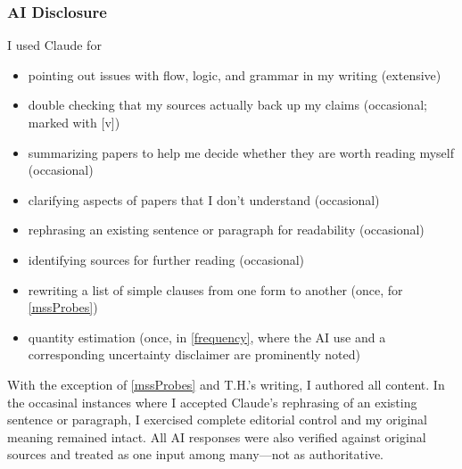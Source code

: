 \documentclass[11pt,oneside]{book}
\begin{document}
\subsubsection*{AI Disclosure}
I used Claude for
\begin{itemize}
    \item pointing out issues with flow, logic, and grammar in my writing (extensive)
    \item double checking that my sources actually back up my claims (occasional; marked with [v])
    \item summarizing papers to help me decide whether they are worth reading myself (occasional)
    \item clarifying aspects of papers that I don't understand (occasional)
    \item rephrasing an existing sentence or paragraph for readability (occasional)
    \item identifying sources for further reading (occasional)
    \item rewriting a list of simple clauses from one form to another (once, for \cref{mssProbes})
    \item quantity estimation (once, in \cref{frequency}, where the AI use and a corresponding uncertainty disclaimer are prominently noted)
\end{itemize}
With the exception of \cref{mssProbes} and T.H.'s writing, I authored all content. In the occasinal instances where I accepted Claude's rephrasing of an existing sentence or paragraph, I exercised complete editorial control and my original meaning remained intact. All AI responses were also verified against original sources and treated as one input among many---not as authoritative.
\end{document}
